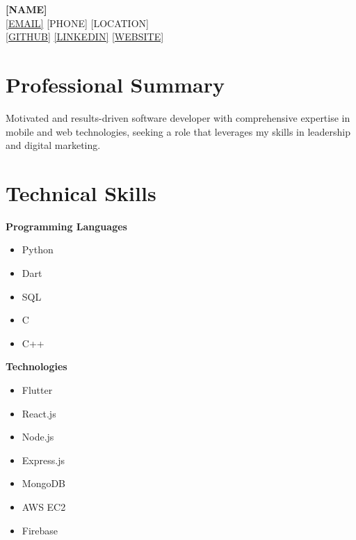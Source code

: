\documentclass[a4paper,10pt]{article}
\begin{document}
\begin{center}
    \textbf{\Large [NAME]} \\[0.2em]
    \small 
    \href{mailto:[EMAIL]}{ [EMAIL]} \quad 
     [PHONE] \quad 
     [LOCATION] \\[0.2em]
    \href{[GITHUB_URL]}{ [GITHUB]} \quad 
    \href{[LINKEDIN_URL]}{ [LINKEDIN]} \quad 
    \href{[WEBSITE_URL]}{ [WEBSITE]}
\end{center}

\vspace{0.5em}

\begin{multicols}{2}
\section*{Professional Summary}
\justifying
Motivated and results-driven software developer with comprehensive expertise in mobile and web technologies, seeking a role that leverages my skills in leadership and digital marketing.

\section*{Technical Skills}
\vspace{-0.3em}
\hspace{1em}\textbf{Programming Languages}
\vspace{-0.2em}
\begin{itemize}[leftmargin=1em,itemsep=0.3em,parsep=0pt,label=$\bullet$]
    \item Python
    \item Dart
    \item SQL
    \item C
    \item C++
\end{itemize}

\vspace{0.3em}
\textbf{Technologies}
\vspace{-0.2em}
\begin{itemize}[leftmargin=1em,itemsep=0.3em,parsep=0pt,label=$\bullet$]
    \item Flutter
    \item React.js
    \item Node.js
    \item Express.js
    \item MongoDB
    \item AWS EC2
    \item Firebase
\end{itemize}


\end{multicols}
\end{document}
